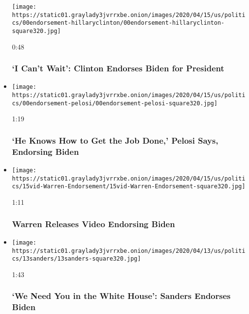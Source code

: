 \begin{itemize}
  \texttt{[image: https://static01.graylady3jvrrxbe.onion/images/2020/04/15/us/politics/00endorsement-hillaryclinton/00endorsement-hillaryclinton-square320.jpg]}

  0:48

  \hypertarget{i-cant-wait-clinton-endorses-biden-for-president}{%
  \subsubsection{`I Can't Wait': Clinton Endorses Biden for
  President}\label{i-cant-wait-clinton-endorses-biden-for-president}}
\item
  \href{https://www.nytimes3xbfgragh.onion/video/us/politics/100000007109631/pelosi-endorses-biden.html?action=click\&module=video-series-bar\&region=header\&pgtype=Article\&playlistId=video/2020-Elections}{}

  \texttt{[image: https://static01.graylady3jvrrxbe.onion/images/2020/04/15/us/politics/00endorsement-pelosi/00endorsement-pelosi-square320.jpg]}

  1:19

  \hypertarget{he-knows-how-to-get-the-job-done-pelosi-says-endorsing-biden}{%
  \subsubsection{`He Knows How to Get the Job Done,' Pelosi Says,
  Endorsing
  Biden}\label{he-knows-how-to-get-the-job-done-pelosi-says-endorsing-biden}}
\item
  \href{https://www.nytimes3xbfgragh.onion/video/us/politics/100000007089056/warren-releases-video-endorsing-biden.html?action=click\&module=video-series-bar\&region=header\&pgtype=Article\&playlistId=video/2020-Elections}{}

  \texttt{[image: https://static01.graylady3jvrrxbe.onion/images/2020/04/15/us/politics/15vid-Warren-Endorsement/15vid-Warren-Endorsement-square320.jpg]}

  1:11

  \hypertarget{warren-releases-video-endorsing-biden}{%
  \subsubsection{Warren Releases Video Endorsing
  Biden}\label{warren-releases-video-endorsing-biden}}
\item
  \href{https://www.nytimes3xbfgragh.onion/video/us/politics/100000007085637/sanders-endorses-biden.html?action=click\&module=video-series-bar\&region=header\&pgtype=Article\&playlistId=video/2020-Elections}{}

  \texttt{[image: https://static01.graylady3jvrrxbe.onion/images/2020/04/13/us/politics/13sanders/13sanders-square320.jpg]}

  1:43

  \hypertarget{we-need-you-in-the-white-house-sanders-endorses-biden}{%
  \subsubsection{`We Need You in the White House': Sanders Endorses
  Biden}\label{we-need-you-in-the-white-house-sanders-endorses-biden}}
\end{itemize}
